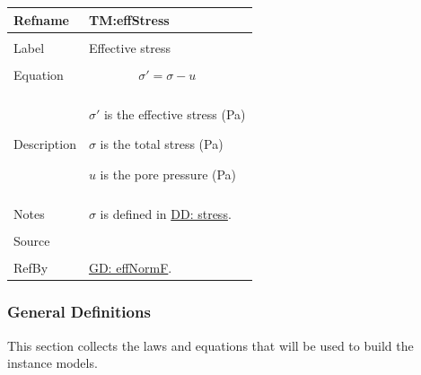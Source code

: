 \documentclass[12pt]{article}
\begin{document}
\noindent \begin{minipage}{\textwidth}
\begin{tabular}{p{} p{}}
\toprule \textbf{Refname} & \textbf{TM:effStress}
\label{TM:effStress}
\\ \midrule \\
Label & Effective stress
        \\ \midrule \\
        Equation & \begin{displaymath}
                   σ'=σ-u
                   \end{displaymath}
                   \\ \midrule \\
                   Description & \begin{symbDescription}
                                 \item{$σ'$ is the effective stress (Pa)}
                                 \item{$σ$ is the total stress (Pa)}
                                 \item{$u$ is the pore pressure (Pa)}
                                 \end{symbDescription}
                                 \\ \midrule \\
                                 Notes & $σ$ is defined in \hyperref[DD:stress]{DD: stress}.
                                         \\ \midrule \\
                                         Source & \cite{fredlund1977}
                                                  \\ \midrule \\
                                                  RefBy & \hyperref[GD:effNormF]{GD: effNormF}.
\\ \bottomrule \end{tabular}
\end{minipage}
\subsubsection{General Definitions}
\label{Sec:GDs}
This section collects the laws and equations that will be used to build the instance models.
\par~
\end{document}
